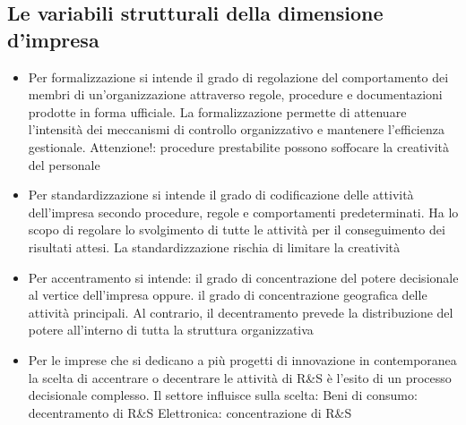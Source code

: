 \documentclass{article}
\begin{document}
\subsection{Le variabili strutturali della dimensione d'impresa}

\begin{itemize}
\item	Per formalizzazione si intende il grado di regolazione del
	comportamento dei membri di un’organizzazione attraverso regole,
	procedure e documentazioni prodotte in forma ufficiale.
	La formalizzazione permette di attenuare l’intensità dei meccanismi di
	controllo organizzativo e mantenere l’efficienza gestionale.
	Attenzione!: procedure prestabilite possono soffocare la creatività del
	personale
	\item Per standardizzazione si intende il grado di codificazione delle attività
	dell’impresa secondo procedure, regole e comportamenti
	predeterminati. Ha lo scopo di regolare lo svolgimento di tutte le attività
	per il conseguimento dei risultati attesi.
	La standardizzazione rischia di limitare la creatività
	
	\item Per accentramento si intende:
	 il grado di concentrazione del potere decisionale al vertice dell’impresa
	oppure.
	il grado di concentrazione geografica delle attività principali.
	Al contrario, il decentramento prevede la distribuzione del potere
	all’interno di tutta la struttura organizzativa
	
	\item Per le imprese che si dedicano a più progetti di innovazione in
	contemporanea la scelta di accentrare o decentrare le attività di R\&S è
	l’esito di un processo decisionale complesso.
	Il settore influisce sulla scelta:
	Beni di consumo: decentramento di R\&S
	Elettronica: concentrazione di R\&S
\end{itemize}
\end{document}
